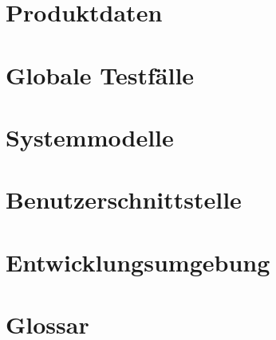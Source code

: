 \documentclass[parskip=full]{scrartcl}
\begin{document}
\section{Produktdaten}


\section{Globale Testf\"alle}


\section{Systemmodelle}


\section{Benutzerschnittstelle}


\section{Entwicklungsumgebung}


\section{Glossar}
\end{document}
